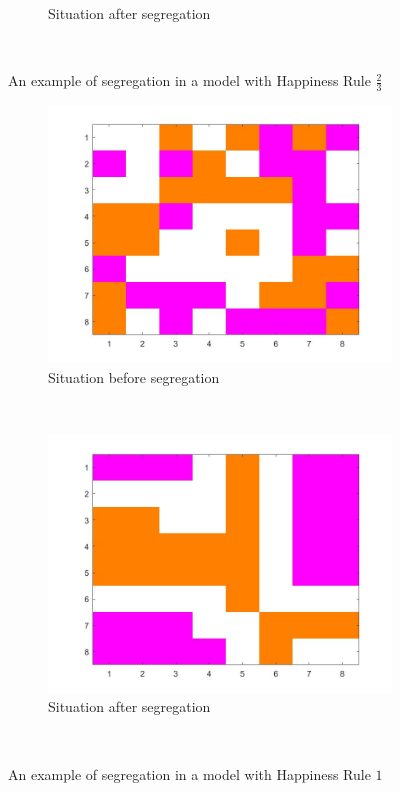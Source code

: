 \begin{figure}[H]
\begin{subfigure}{0.4\textwidth}
        \caption{Situation after segregation}
        \label{fig:example hap 2/3 end}
    \end{subfigure}
    ~ 
    \vspace{-5pt}
    \caption{An example of segregation in a model with Happiness Rule $\frac{2}{3}$}
    \label{fig:examplehap2/3}
\end{figure}

\begin{figure}[H]
	\centering
    \begin{subfigure}{0.4\textwidth}
        \includegraphics[width=\textwidth]{vb4beginbord.jpg}
        \caption{Situation before segregation}
        \label{fig:example hap 1 begin}
    \end{subfigure}\hspace{0cm}
    ~ 
    \begin{subfigure}{0.4\textwidth}
        \includegraphics[width=\textwidth]{vb4eindbord.jpg}
        \caption{Situation after segregation}
        \label{fig:example hap 1 end}
    \end{subfigure}
    ~ 
    \vspace{-5pt}
    \caption{An example of segregation in a model with Happiness Rule $1$}
    \label{fig:examplehap1}
\end{figure}

